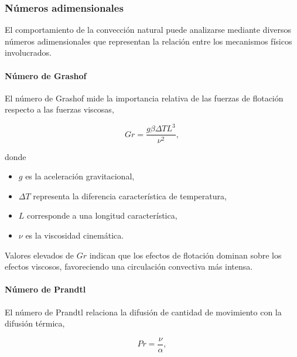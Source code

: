 \subsubsection{Números adimensionales}

El comportamiento de la convección natural puede analizarse mediante diversos números adimensionales que representan la relación entre los mecanismos físicos involucrados.

\paragraph{Número de Grashof}

El número de Grashof mide la importancia relativa de las fuerzas de flotación respecto a las fuerzas viscosas,

\begin{equation}
Gr=
\frac
{g\beta\Delta TL^3}
{\nu^2},
\end{equation}

donde

\begin{itemize}

\item $g$ es la aceleración gravitacional,

\item $\Delta T$ representa la diferencia característica de temperatura,

\item $L$ corresponde a una longitud característica,

\item $\nu$ es la viscosidad cinemática.
\end{itemize}

Valores elevados de $Gr$ indican que los efectos de flotación dominan sobre los efectos viscosos, favoreciendo una circulación convectiva más intensa.


\paragraph{Número de Prandtl}

El número de Prandtl relaciona la difusión de cantidad de movimiento con la difusión térmica,

\begin{equation}
Pr=
\frac{\nu}{\alpha},
\end{equation}

